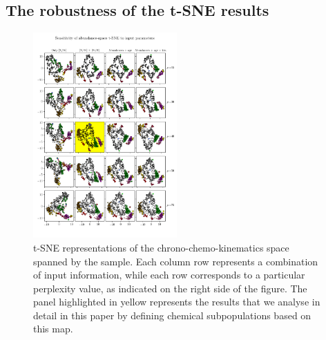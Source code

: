 \documentclass{aa}  %
\begin{document}
\subsection{The robustness of the t-SNE results}\label{robust}

\begin{figure}\centering
 \includegraphics[width=0.49\textwidth]{im/harps-tSNE_perplexitytest_withsubsets.png}
\caption{t-SNE representations of the chrono-chemo-kinematics space spanned by the \citet{DelgadoMena2017} sample. Each column row represents a combination of input information, while each row corresponds to a particular perplexity value, as indicated on the right side of the figure. The panel highlighted in yellow represents the results that we analyse in detail in this paper by defining chemical subpopulations based on this map.}
\label{perplexitytest2}
\end{figure}
\end{document}
